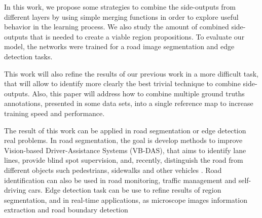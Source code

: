 In this work, we propose some strategies to combine the side-outputs from different layers by using simple merging functions in order to explore useful behavior in the learning process.
We also study the amount of combined side-outputs that is needed to create a viable region propositions.
To evaluate our model, the networks were trained for a road image segmentation and edge detection tasks.

This work will also refine the results of our previous work \cite{Reis:2019} in a more difficult task, that will allow to identify more clearly the best trivial technique to combine side-outputs.
Also, this paper will address how to combine multiple ground truths annotations, presented in some data sets, into a single reference map to increase training speed and performance.

The result of this work can be applied in road segmentation or edge detection real problems.
In road segmentation, the goal is develop methods to improve Vision-based Driver-Assistance Systems (VB-DAS), that aims to identify lane lines, provide blind spot supervision, and, recently, distinguish the road from different objects such pedestrians, sidewalks and other vehicles \cite{Saleem:2018, Yang:2018, Rezaei:2017}.
Road identification can also be used in road monitoring, traffic management and self-driving cars.
Edge detection task can be use to refine results of region segmentation, and in real-time applications, as microscope images information extraction and road boundary detection \cite{Qu:2020, Li:2020, Perng:2020}

